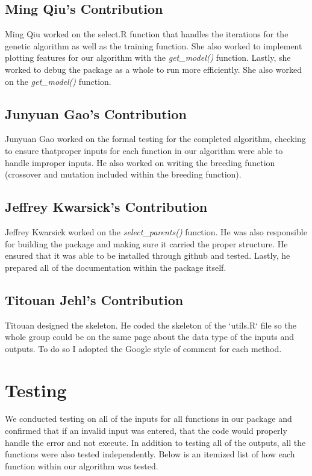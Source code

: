 \documentclass{article}\usepackage[]{graphicx}\usepackage[]{color}
\begin{document}
\subsection{Ming Qiu's Contribution}
Ming Qiu worked on the select.R function that handles the iterations for the genetic algorithm as
well as the training function.  She also worked to implement plotting features for our algorithm with the \emph{get\_model()} function.  Lastly, she worked to debug the package as a whole to run more efficiently. She also worked on the \emph{get\_model()} function.

\subsection{Junyuan Gao's Contribution}
Junyuan Gao worked on the formal testing for the completed algorithm, checking to ensure thatproper inputs for each function in our algorithm were able to handle improper inputs. He also worked on writing the breeding function (crossover and mutation included within the breeding function).

\subsection{Jeffrey Kwarsick's Contribution}
Jeffrey Kwarsick worked on the \emph{select\_parents()} function. He was also responsible for building
the package and making sure it carried the proper structure.  He ensured that it was able to be installed through github and tested.  Lastly, he prepared all of the documentation within the package itself.

\subsection{Titouan Jehl's Contribution}
Titouan designed the skeleton. He coded the skeleton of the ‘utils.R‘ file so the whole group could be on the same page about the data type of the inputs and outputs. To do so I adopted the Google style of comment for each method.

\section{Testing}
We conducted testing on all of the inputs for all functions in our package and confirmed that if an invalid input was entered, that the code would properly handle the error and not execute. In addition to testing all of the outputs, all the functions were also tested independently. Below is an itemized list of how each function within our algorithm was tested.
\end{document}
